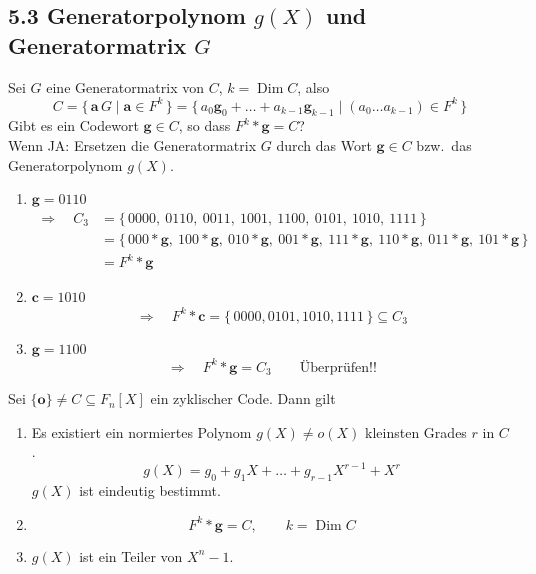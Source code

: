 \subsection{5.3 Generatorpolynom $g(X)$ und Generatormatrix $G$}

Sei $G$ eine Generatormatrix von $C$, $k = \operatorname{Dim} C$, also
\[
C = \{\, \mathbf{a}\, G \mid \mathbf{a} \in F^k \,\} = \{\, a_0 \mathbf{g}_0 + \dots + a_{k-1} \mathbf{g}_{k-1} \mid (a_0 \dots a_{k-1}) \in F^k \,\}
\]
Gibt es ein Codewort $\mathbf{g} \in C$, so dass $F^k * \mathbf{g} = C$?\\
Wenn JA: Ersetzen die Generatormatrix $G$ durch das Wort $\mathbf{g} \in C$ bzw.\ das Generatorpolynom $g(X)$.

\begin{beispiel}[$C_3$, $k = \operatorname{Dim} C_3 = 3$, $F^k = \{000, 100, 010, 001, 111, 110, 011, 101\}$]\leavevmode
\begin{enumerate}[label=\alph*)]
\item $\mathbf{g} = 0110$
\begin{align*}
\Rightarrow\quad C_3 &= \{\, 0000,\ 0110,\ 0011,\ 1001,\ 1100,\ 0101,\ 1010,\ 1111 \,\} \\
&= \{\, 000 * \mathbf{g},\ 100 * \mathbf{g},\ 010 * \mathbf{g},\ 001 * \mathbf{g},\ 111 * \mathbf{g},\ 110 * \mathbf{g},\ 011 * \mathbf{g},\ 101 * \mathbf{g} \,\} \\
&= F^k * \mathbf{g}
\end{align*}
\item $\mathbf{c} = 1010$
\[
\Rightarrow\quad F^k * \mathbf{c} = \{\, 0000, 0101, 1010, 1111 \,\} \subseteq C_3
\]
\item $\mathbf{g} = 1100$
\[
\Rightarrow\quad F^k * \mathbf{g} = C_3 \qquad \text{Überprüfen!!}
\]
\end{enumerate}
\end{beispiel}

\begin{satz}
Sei $\{\mathbf{o}\} \neq C \subseteq F_n[X]$ ein zyklischer Code. Dann gilt
\begin{enumerate}[label=(\arabic*)]
\item Es existiert ein normiertes Polynom $g(X) \neq o(X)$ kleinsten Grades $r$ in $C$.
\[
g(X) = g_0 + g_1 X + \dots + g_{r-1} X^{r-1} + X^r
\]
$g(X)$ ist eindeutig bestimmt.
\item \[ F^k * \mathbf{g} = C, \qquad k = \operatorname{Dim} C \]
\item $g(X)$ ist ein Teiler von $X^n - 1$.
\end{enumerate}
\end{satz}

